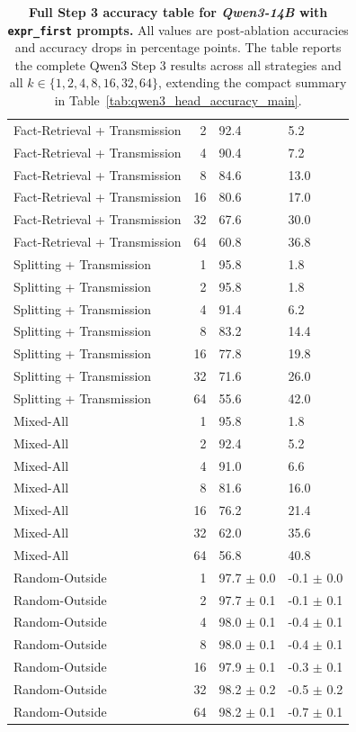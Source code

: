 \documentclass[11pt]{article}
\begin{document}
\begin{table}[p]
{\begin{tabular}{@{} l r l l @{}}
Fact-Retrieval + Transmission & 2 & 92.4 & 5.2 \\
Fact-Retrieval + Transmission & 4 & 90.4 & 7.2 \\
Fact-Retrieval + Transmission & 8 & 84.6 & 13.0 \\
Fact-Retrieval + Transmission & 16 & 80.6 & 17.0 \\
Fact-Retrieval + Transmission & 32 & 67.6 & 30.0 \\
Fact-Retrieval + Transmission & 64 & 60.8 & 36.8 \\
Splitting + Transmission & 1 & 95.8 & 1.8 \\
Splitting + Transmission & 2 & 95.8 & 1.8 \\
Splitting + Transmission & 4 & 91.4 & 6.2 \\
Splitting + Transmission & 8 & 83.2 & 14.4 \\
Splitting + Transmission & 16 & 77.8 & 19.8 \\
Splitting + Transmission & 32 & 71.6 & 26.0 \\
Splitting + Transmission & 64 & 55.6 & 42.0 \\
Mixed-All & 1 & 95.8 & 1.8 \\
Mixed-All & 2 & 92.4 & 5.2 \\
Mixed-All & 4 & 91.0 & 6.6 \\
Mixed-All & 8 & 81.6 & 16.0 \\
Mixed-All & 16 & 76.2 & 21.4 \\
Mixed-All & 32 & 62.0 & 35.6 \\
Mixed-All & 64 & 56.8 & 40.8 \\
Random-Outside & 1 & 97.7 $\pm$ 0.0 & -0.1 $\pm$ 0.0 \\
Random-Outside & 2 & 97.7 $\pm$ 0.1 & -0.1 $\pm$ 0.1 \\
Random-Outside & 4 & 98.0 $\pm$ 0.1 & -0.4 $\pm$ 0.1 \\
Random-Outside & 8 & 98.0 $\pm$ 0.1 & -0.4 $\pm$ 0.1 \\
Random-Outside & 16 & 97.9 $\pm$ 0.1 & -0.3 $\pm$ 0.1 \\
Random-Outside & 32 & 98.2 $\pm$ 0.2 & -0.5 $\pm$ 0.2 \\
Random-Outside & 64 & 98.2 $\pm$ 0.1 & -0.7 $\pm$ 0.1 \\
\bottomrule
\end{tabular}%
}
\caption{\textbf{Full Step 3 accuracy table for \textit{Qwen3-14B} with \texttt{expr\_first} prompts.} All values are post-ablation accuracies and accuracy drops in percentage points. The table reports the complete Qwen3 Step 3 results across all strategies and all $k \in \{1,2,4,8,16,32,64\}$, extending the compact summary in Table~\ref{tab:qwen3_head_accuracy_main}.}
\label{tab:qwen3_14b_ef_full_accuracy}
\end{table}
\end{document}
